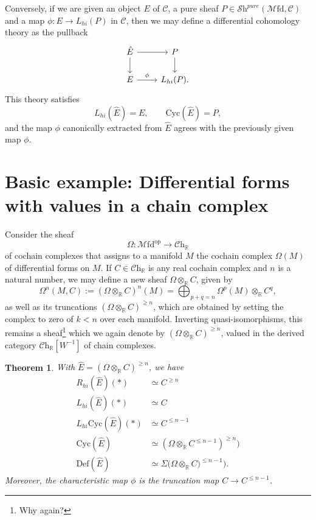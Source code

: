 \documentclass[a4paper]{book}
\newcommand{\lC}{\mathcal{C}}
\newcommand{\lM}{\mathcal{M}}
\newcommand{\bR}{\mathbb{R}}
\newcommand{\lS}{\mathcal{S}}
\newcommand{\Shv}{\lS\mathrm{h}} %
\newcommand{\Ch}{\lC\mathrm{h}} %
\newcommand{\Mfd}{\lM\mathrm{fd}} %
\newtheorem{theorem}[equation]{Theorem}
\theoremstyle{definition}
\theoremstyle{remark}
\numberwithin{equation}{section}
\begin{document}
Conversely, if we are given an object $E$ of $\lC$, a pure sheaf $P \in \Shv^{pure}(\Mfd, \lC)$ and a map $\phi: E \to L_{hi}(P)$ in $\lC$, then we may define a differential cohomology theory as the pullback
\[
\begin{tikzcd}
	\hat{E} \ar[r] \ar[d] & P
	\ar[d]
	\\
	E \ar[r, "\phi"] & L_{hi}(P).
\end{tikzcd}
\]
This theory satisfies
\[
L_{hi}(\hat{E}) = E, \qquad \mathrm{Cyc}(\hat{E}) = P, 
\]
and the map $\phi$ canonically extracted from $\hat{E}$ agrees with the previously given map $\phi$.


\section{Basic example: Differential forms with values in a chain complex}
Consider the sheaf
\[
\Omega : \Mfd^{\mathrm{op}} \longrightarrow \Ch_\bR
\]
of cochain complexes that assigns to a manifold $M$ the cochain complex $\Omega(M)$ of differential forms on $M$. If $C \in \Ch_\bR$ is any real cochain complex and $n$ is a natural number, we may define a new sheaf $\Omega \otimes_\bR C$, given by
\[
\Omega^n(M, C) := (\Omega \otimes_\bR C)^n(M) = \bigoplus_{p + q = n} \Omega^p(M) \otimes_{\bR} C^q,
\]
as well as its truncations $(\Omega \otimes_{\bR} C)^{\geq n}$, which are obtained by setting the complex to zero of $k < n$ over each manifold. Inverting quasi-isomorphisms, this remains a sheaf\footnote{Why again?} which we again denote by $(\Omega \otimes_{\bR} C)^{\geq n}$, valued in the derived category $\Ch_\bR[W^{-1}]$ of chain complexes.
 
\begin{theorem}\cite[Lemma~4.4]{bunkenikolausvoelkl2016diffcoh}
With $\hat{E} = (\Omega \otimes_\bR C)^{\geq n}$, we have
 \begin{align*}
R_{hi}(\hat{E})(*) &\simeq C^{\geq n}
\\
L_{hi}(\hat{E})(*) &\simeq C
\\
L_{hi}\mathrm{Cyc}(\hat{E})(*) &\simeq C^{\leq n-1}
\\
\mathrm{Cyc}(\hat{E}) &\simeq (\Omega \otimes_\bR C^{\leq n-1})^{\geq n})
\\
\mathrm{Def}(\hat{E}) &\simeq \Sigma \bigl(\Omega \otimes_\bR C)^{\leq n-1}\bigr).
 \end{align*}	
Moreover, the characteristic map $\phi$ is the truncation map $C \to C^{\leq n-1}$.
 \end{theorem}
 
\end{document}

